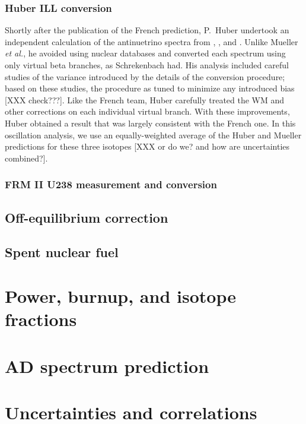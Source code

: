 \documentclass[../thesis.tex]{subfiles}
\begin{document}
\subsubsection{Huber ILL conversion}
\label{sec:huberconv}

Shortly after the publication of the French prediction, P.~Huber undertook an independent calculation of the antinuetrino spectra from \urfive, \punine, and \puone. Unlike Mueller \emph{et al.}, he avoided using nuclear databases and converted each spectrum using only virtual beta branches, as Schrekenbach had. His analysis included careful studies of the variance introduced by the details of the conversion procedure; based on these studies, the procedure as tuned to minimize any introduced bias [XXX check???]. Like the French team, Huber carefully treated the WM and other corrections on each individual virtual branch. With these improvements, Huber obtained a result that was largely consistent with the French one. In this oscillation analysis, we use an equally-weighted average of the Huber and Mueller predictions for these three isotopes [XXX or do we? and how are uncertainties combined?].

\subsubsection{FRM II U238 measurement and conversion}
\label{sec:u238conv}

\subsection{Off-equilibrium correction}
\label{sec:offeqcorr}

\subsection{Spent nuclear fuel}
\label{sec:snfcorr}

\section{Power, burnup, and isotope fractions}
\label{sec:reacpow}

\section{AD spectrum prediction}
\label{sec:adspectra}

\section{Uncertainties and correlations}
\label{sec:reacunccorr}
\end{document}
